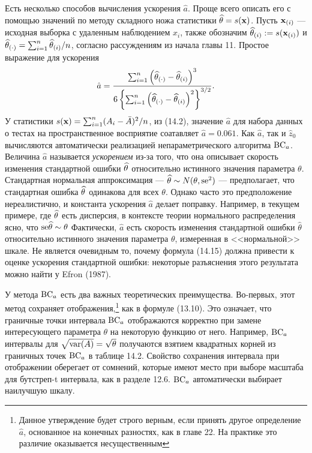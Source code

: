 Есть несколько способов вычисления ускорения $\hat a$. Проще всего описать его с помощью значений по методу складного ножа статистики $\widehat{\theta} = s(\mathbf x)$. Пусть $\mathbf x_{(i)}$ --- исходная выборка с удаленным наблюдением $x_i$, также обозначим $\widehat{\theta} _{(i)} := s(\mathbf x_{(i)})$  и $\widehat{\theta}_{(\cdot)} = \sum_{i = 1}^{n} \widehat{\theta}_{(i)}/n$, согласно рассуждениям из начала главы 11. Простое выражение для ускорения
\begin{equation}
  \hat a = \frac{\sum_{i = 1}^{n}\left(\widehat{\theta}_{(\cdot)} - \widehat{\theta}_{(i)}\right)^3}{6 \left\{\sum_{i = 1}^{n}\left(\widehat{\theta}_{(\cdot)} - \widehat{\theta}_{(i)}\right)^2\right\}^{3/2}}.
\end{equation}
У статистики $s(\mathbf x) = \sum_{i=1}^{n} (A_i - \bar A)^2/n$, из (14.2), значение $\hat a$ для набора данных о тестах на пространственное восприятие соатавляет $\hat a = 0.061$. Как $\hat a$, так и $\hat z_0$ вычисляются автоматически реализацией непараметрического алгоритма $\mathrm{BC}_a$. Величина $\hat a$ называется \textit{ускорением} из-за того, что она описывает скорость изменения стандартной ошибки $\widehat{\theta}$ относительно истинного значения параметра $\theta$. Стандартная нормальная аппроксимация --- $\widehat{\theta} \sim N(\theta, \text{se}^2)$ --- предполагает, что стандартная ошибка $\widehat{\theta}$ одинакова для всех $\theta$. Однако часто это предположение нереалистично, и константа ускорения $\hat a $ делает поправку. Например, в текущем примере, где $\widehat{\theta}$ есть дисперсия, в контексте теории нормального распределения ясно, что $\text{se} \widehat{\theta} \sim \theta$ %
Фактически, $\hat a $ есть скорость изменения стандартной ошибки $\hat \theta$ относительно истинного значения параметра $\theta$, измеренная в <<нормальной>> шкале. Не является очевидным то, почему формула (14.15) должна привести к оценке ускорения стандартной ошибки: некоторые разъяснения этого результата можно найти у Efron (1987).

У метода $\mathrm{BC}_a$ есть два важных теоретических преимущества. Во-первых, этот метод сохраняет отображения,\footnote{Данное утверждение будет строго верным, если принять другое определение $\hat a$, основанное на конечных разностях, как в главе 22. На практике это различие оказывается несущественным} как в формуле (13.10). Это означает, что граничные точки интервала $\mathrm{BC}_a$ отображаются корректно при замене интересующего параметра $\theta$ на некоторую функцию от него. Например, $\mathrm{BC}_a$ интервалы для $\sqrt{\text{var}(A)}=\sqrt{\theta}$ получаются взятием квадратных корней из граничных точек $\mathrm{BC}_a$ в таблице 14.2. Свойство сохранения интервала при отображении оберегает от сомнений, которые имеют место при выборе масштаба для бутстреп-t интервала, как в разделе 12.6. $\mathrm{BC}_a$ автоматически выбирает наилучшую шкалу.

